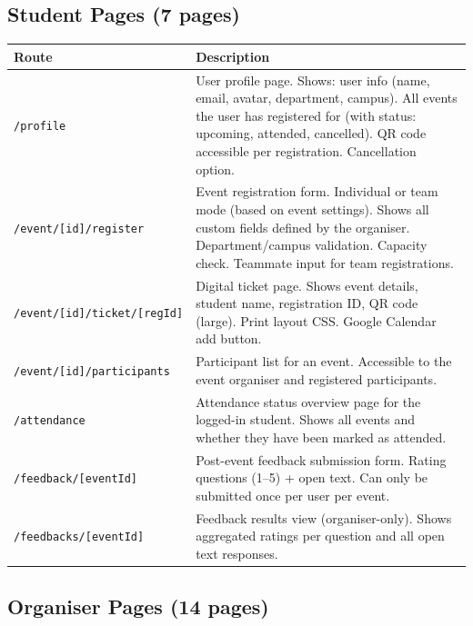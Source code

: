 \documentclass[12pt,a4paper]{article}
\begin{document}
\subsection{Student Pages (7 pages)}

\begin{tabularx}{\textwidth}{L{5cm} X}
\toprule
{}
\textbf{Route} & \textbf{Description} \\
\midrule
\texttt{/profile} & User profile page. Shows: user info (name, email, avatar, department, campus). All events the user has registered for (with status: upcoming, attended, cancelled). QR code accessible per registration. Cancellation option. \\
\texttt{/event/[id]/register} & Event registration form. Individual or team mode (based on event settings). Shows all custom fields defined by the organiser. Department/campus validation. Capacity check. Teammate input for team registrations. \\
\texttt{/event/[id]/ticket/[regId]} & Digital ticket page. Shows event details, student name, registration ID, QR code (large). Print layout CSS. Google Calendar add button. \\
\texttt{/event/[id]/participants} & Participant list for an event. Accessible to the event organiser and registered participants. \\
\texttt{/attendance} & Attendance status overview page for the logged-in student. Shows all events and whether they have been marked as attended. \\
\texttt{/feedback/[eventId]} & Post-event feedback submission form. Rating questions (1--5) + open text. Can only be submitted once per user per event. \\
\texttt{/feedbacks/[eventId]} & Feedback results view (organiser-only). Shows aggregated ratings per question and all open text responses. \\
\bottomrule
\end{tabularx}

\subsection{Organiser Pages (14 pages)}
\end{document}
